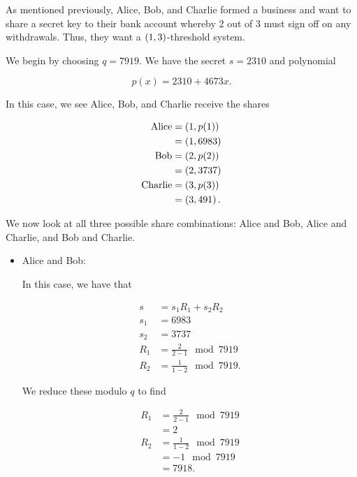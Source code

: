 \begin{example}

As mentioned previously, Alice, Bob, and Charlie formed a business
and want to share a secret key to their bank account whereby
2 out of 3 must sign off on any withdrawals.
Thus, they want a $\left( 1,3 \right)$-threshold system.

We begin by choosing $q = 7919$.
We have the secret $s = 2310$ and polynomial

\begin{equation}
    p(x) = 2310 + 4673x.
\end{equation}

\noindent
In this case, we see Alice, Bob, and Charlie receive the shares

\begin{align}
    \text{Alice} &= \left( 1, p(1) \right) \nonumber\\
        &= \left( 1, 6983 \right) \nonumber\\
    \text{Bob} &= \left( 2, p(2) \right) \nonumber\\
        &= \left( 2, 3737 \right) \nonumber\\
    \text{Charlie} &= \left( 3, p(3) \right) \nonumber\\
        &= \left( 3, 491 \right).
\end{align}

We now look at all three possible share combinations:
Alice and Bob, Alice and Charlie, and Bob and Charlie.

\begin{itemize}
\item Alice and Bob:

In this case, we have that

\begin{align}
    s &= s_{1}R_{1} + s_{2}R_{2} \nonumber\\
    s_{1} &= 6983 \nonumber\\
    s_{2} &= 3737 \nonumber\\
    R_{1} &= \frac{2}{2-1} \mod 7919 \nonumber\\
    R_{2} &= \frac{1}{1-2} \mod 7919.
\end{align}

\noindent
We reduce these modulo $q$ to find

\begin{align}
    R_{1} &= \frac{2}{2-1} \mod 7919 \nonumber\\
        &= 2 \nonumber\\
    R_{2} &= \frac{1}{1-2} \mod 7919 \nonumber\\
        &= -1 \mod 7919 \nonumber\\
        &= 7918.
\end{align}


\end{itemize}
\end{example}
